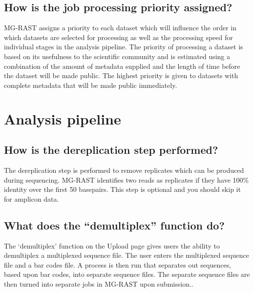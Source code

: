 \documentclass[12pt,fullpage]{report}
\begin{document}
\subsection{How is the job processing priority assigned?}
MG-RAST assigns a priority to each dataset which will influence the order in which datasets are selected for processing as well as the processing speed for individual stages in the analysis pipeline. The priority of processing a dataset is based on its usefulness to the scientific community and is estimated using a combination of the amount of metadata supplied and the length of time before the dataset will be made public. The highest priority is given to datasets with complete metadata that will be made public immediately.
\section{Analysis pipeline}
\subsection{How is the dereplication step performed?}
The dereplication step is performed to remove replicates which can be produced during sequencing. MG-RAST identifies two reads as replicates if they have 100\% identity over the first 50 basepairs. This step is optional and you should skip it for amplicon data.
\subsection{What does the ``demultiplex'' function do?}
The `demultiplex' function on the Upload page gives users the ability to demultiplex a multiplexed sequence file. The user enters the multiplexed sequence file and a bar codes file. A process is then run that separates out sequences, based upon bar codes, into separate sequence files. The separate sequence files are then turned into separate jobs in MG-RAST upon submission..
\end{document}
